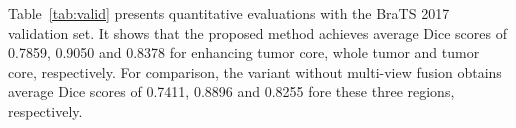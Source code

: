 \documentclass[a4paper,orivec,runningheads]{llncs}
\begin{document}
\begin{comment}
\begin{table}
	\centering
	\small
	\caption{Dice and Hausdorff measurements of our method (UCL-TIG) compared with top performance achieved by other teams. The results were provided by the BraTS 2017 validation leaderboard up to August 31, 2017. EN, WT, TC denote enhancing tumor core, whole tumor and tumor core, respectively.}
	\label{tab:dice}
	\begin{tabular}{l|c|c|c|c|c|c}
		\hline
		& \multicolumn{3}{c|}{Dice} & \multicolumn{3}{c}{Hausdorff}  \\ \hline
		& ET & WT & TC & ET & WT & TC \\ \hline
		UCL-TIG* & 0.7859 & 0.9050 & 0.8378 & 3.2821 & 3.8901 & 6.4790 \\
		biomedia1 & 0.7570 & 0.9016 & 0.8202 & 4.2225 & 4.5576 & 6.1055\\
		MIC-DKFZ & 0.7320 & 0.8964 & 0.7971 & 4.5470 & 6.9741 & 9.4767\\
		pvg & 0.7353 & 0.8885 & 0.7711 & 6.3246 & 4.3354 & 8.6320\\
		Zhouch & 0.7605 & 0.9034 & 0.8246 & 3.7199 & 4.8768 & 6.7466\\
    
		\hline
	\end{tabular}
\end{table}

\begin{table}
	\centering
	\small
	\caption{Sensitivity and specificity measurements of our method (UCL-TIG) compared with top performance achieved by other teams. The results were provided by the BraTS 2017 validation leaderboard up to August 31, 2017. EN, WT, TC denote enhancing tumor core, whole tumor and tumor core, respectively.}
	\label{tab:sensitivity}
	\begin{tabular}{l|c|c|c|c|c|c}
		\hline
		& \multicolumn{3}{c|}{Sensitivity} & \multicolumn{3}{c}{Specificity}  \\ \hline
		& ET & WT & TC & ET & WT & TC \\ \hline
		UCL-TIG* & 0.7748 & 0.9118 & 0.8412 & 0.9985 & 0.9942 & 0.9973 \\
		biomedia1 & 0.7895 &	0.9088 &	0.7829 & 0.9982 & 0.9946 & 0.9986\\
		MIC-DKFZ & 0.7900 & 0.8965 & 0.7807 & 0.9984 & 0.9956 & 0.9988\\
		pvg & 0.7676 &0.8941 & 0.7558 & 0.9980 & 0.9950 & 0.9980\\
		Zhouch & 0.8004 & 0.9058 & 0.8198 & 0.9980 & 0.9952 & 0.9970\\
    
		\hline
	\end{tabular}
\end{table}
\end{comment}
Table~\ref{tab:valid} presents quantitative evaluations with the BraTS 2017 validation set. It shows that the proposed method achieves average Dice scores of 0.7859, 0.9050 and 0.8378 for enhancing tumor core, whole tumor and tumor core, respectively. For comparison, the variant without multi-view fusion obtains average Dice scores of 0.7411, 0.8896 and 0.8255 fore these three regions, respectively. 
\end{document}
